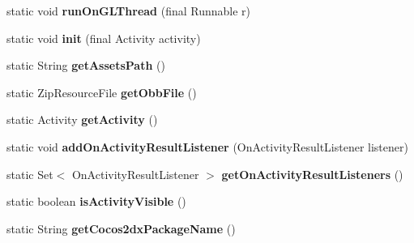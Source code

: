 \begin{DoxyCompactItemize}
static void {\bfseries run\+On\+G\+L\+Thread} (final Runnable r)
\item 
\mbox{\label{classorg_1_1cocos2dx_1_1lib_1_1Cocos2dxHelper_ab7491aa2e4ea85d0a1e29e97cdc8d61a}} 
static void {\bfseries init} (final Activity activity)
\item 
\mbox{\label{classorg_1_1cocos2dx_1_1lib_1_1Cocos2dxHelper_a672fe73fa5ca953bcca2ed6f8093f65f}} 
static String {\bfseries get\+Assets\+Path} ()
\item 
\mbox{\label{classorg_1_1cocos2dx_1_1lib_1_1Cocos2dxHelper_a29e431c86a8643b06b7cd11fab55cb11}} 
static Zip\+Resource\+File {\bfseries get\+Obb\+File} ()
\item 
\mbox{\label{classorg_1_1cocos2dx_1_1lib_1_1Cocos2dxHelper_a8855b74d2ecb5b1c3862147b7a20c471}} 
static Activity {\bfseries get\+Activity} ()
\item 
\mbox{\label{classorg_1_1cocos2dx_1_1lib_1_1Cocos2dxHelper_a1e683f632a75a80028b597ed7d703466}} 
static void {\bfseries add\+On\+Activity\+Result\+Listener} (On\+Activity\+Result\+Listener listener)
\item 
\mbox{\label{classorg_1_1cocos2dx_1_1lib_1_1Cocos2dxHelper_aea55b630ed46e74ea00365ec608a1e60}} 
static Set$<$ On\+Activity\+Result\+Listener $>$ {\bfseries get\+On\+Activity\+Result\+Listeners} ()
\item 
\mbox{\label{classorg_1_1cocos2dx_1_1lib_1_1Cocos2dxHelper_a6f1eb4434a78f31b3fd461bba28068b7}} 
static boolean {\bfseries is\+Activity\+Visible} ()
\item 
\mbox{\label{classorg_1_1cocos2dx_1_1lib_1_1Cocos2dxHelper_af50dfed99649d6946249f1edbdaf2497}} 
static String {\bfseries get\+Cocos2dx\+Package\+Name} ()
\item 
\mbox{\label{classorg_1_1cocos2dx_1_1lib_1_1Cocos2dxHelper_a2f0a6806db6e04806d6432746c33bb2f}} 

\end{DoxyCompactItemize}
